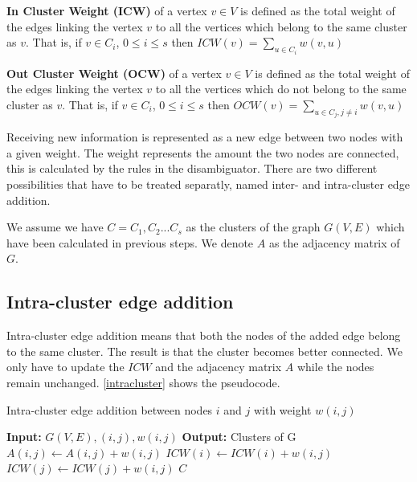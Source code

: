 \begin{mydef}
\textbf{In Cluster Weight (ICW)} of a vertex $v \in V$ is defined as the total weight of the edges linking the vertex $v$ to all the vertices which belong to the same cluster as $v$. That is, if $v \in C_i$, $0 \leq i \leq s$ then $ICW(v) = \sum_{u \in C_i}{w(v,u)}$
\end{mydef}

\begin{mydef}
\textbf{Out Cluster Weight (OCW)} of a vertex $v \in V$ is defined as the total weight of the edges linking the vertex $v$ to all the vertices which do not belong to the same cluster as $v$. That is, if $v \in C_i$, $0 \leq i \leq s$ then $OCW(v) = \sum_{u \in C_j, j \neq i}{w(v,u)}$
\end{mydef}

Receiving new information is represented as a new edge between two nodes with a given weight. The weight represents the amount the two nodes are connected, this is calculated by the rules in the disambiguator. There are two different possibilities that have to be treated separatly, named inter- and intra-cluster edge addition.

We assume we have $C = {C_1,C_2...C_s}$ as the clusters of the graph $G(V,E)$ which have been calculated in previous steps. We denote $A$ as the adjacency matrix of $G$.

\subsection{Intra-cluster edge addition}

Intra-cluster edge addition means that both the nodes of the added edge belong to the same cluster. The result is that the cluster becomes better connected. We only have to update the $ICW$ and the adjacency matrix $A$ while the nodes remain unchanged. \autoref{intracluster} shows the pseudocode.

\begin{algorithm}
\caption{Intra-cluster edge addition between nodes $i$ and $j$ with weight $w(i,j)$}
\label{intracluster}
\begin{algorithmic}
\STATE \textbf{Input:} $G(V,E), (i,j), w(i,j)$ 
\STATE \textbf{Output:} Clusters of G
\STATE $A(i,j) \leftarrow A(i,j) + w(i,j)$
\STATE $ICW(i) \leftarrow ICW(i) + w(i,j)$
\STATE $ICW(j) \leftarrow ICW(j) + w(i,j)$
\RETURN $C$
\end{algorithmic}
\end{algorithm}

